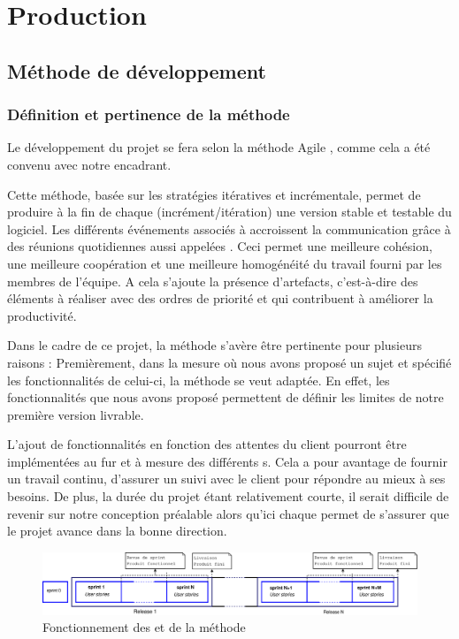 \chapter{Production}
\section{Méthode de développement}
\subsection{Définition et pertinence de la méthode }
Le développement du projet se fera selon la méthode Agile , comme cela a été convenu avec notre encadrant.

Cette méthode, basée sur les stratégies itératives et incrémentale, permet de produire à la fin de chaque  (incrément/itération) une
version stable et testable du logiciel. Les différents événements associés à  accroissent la communication grâce à des réunions quotidiennes
aussi appelées . Ceci permet une meilleure cohésion, une meilleure coopération et une meilleure homogénéité du travail fourni par les
membres de l'équipe. A cela s'ajoute la présence d'artefacts, c'est-à-dire des éléments à réaliser avec des ordres de priorité et qui contribuent à
améliorer la productivité.
                    
Dans le cadre de ce projet, la méthode  s’avère être pertinente pour plusieurs raisons : 
Premièrement, dans la mesure où nous avons proposé un sujet et spécifié les fonctionnalités de celui-ci, la méthode  se veut adaptée. En effet,
les fonctionnalités que nous avons proposé permettent de définir les limites de notre première version  livrable. 

L'ajout de fonctionnalités en fonction des attentes du client pourront être implémentées au fur et à mesure des différents s.  Cela a pour
avantage de fournir un travail continu, d’assurer un suivi avec le client pour répondre au mieux à ses besoins. De plus, la durée du projet étant
relativement courte, il serait difficile de revenir sur notre conception préalable alors qu'ici chaque  permet de s’assurer que le projet
avance dans la bonne direction.

\begin{figure}[H]
	\centering
	\includegraphics[width=18cm]{screens/scrum.eps}
	\caption{Fonctionnement des  et  de la méthode }
\end{figure}

